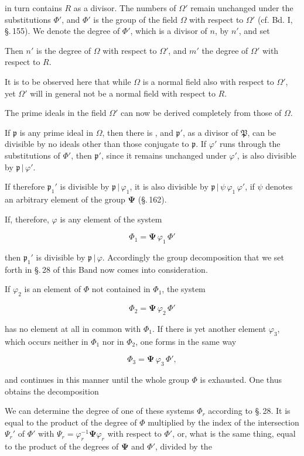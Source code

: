 in turn contains $R$ as a divisor. The numbers of $\Omega'$ remain
unchanged under the substitutions $\Phi'$, and $\Phi'$ is the group of the
field $\Omega$ with respect to $\Omega'$ (cf. Bd. I, \S.\,155). We denote
the degree of $\Phi'$, which is a divisor of $n$, by $n'$, and set


Then $n'$ is the degree of $\Omega$ with respect to $\Omega'$, and $m'$
the degree of $\Omega'$ with respect to $R$.

It is to be observed here that while $\Omega$ is a normal field
also with respect to $\Omega'$, yet $\Omega'$ will in general not be a
normal field with respect to $R$.

The prime ideals in the field $\Omega'$ can now be derived completely
from those of $\Omega$.

If $\mathfrak{p}$ is any prime ideal in $\Omega$, then there is , and $\mathfrak{p}'$, as a
divisor of $\mathfrak{P}$, can be divisible by no ideals other than those
conjugate to $\mathfrak{p}$. If $\varphi'$ runs through the substitutions of $\Phi'$, then $\mathfrak{p}'$,
since it remains unchanged under $\varphi'$, is also divisible by $\mathfrak{p}\,|\,\varphi'$.

If therefore $\mathfrak{p}_1'$ is divisible by $\mathfrak{p}\,|\,\varphi_1$, it is also divisible by
$\mathfrak{p}\,|\,\psi\,\varphi_1\,\varphi'$, if $\psi$ denotes an arbitrary element of the group
$\boldsymbol{\Psi}$ (\S.\,162).

If, therefore, $\varphi$ is any element of the system

\[
\Phi_1 = \boldsymbol{\Psi}\,\varphi_1\,\Phi'
\]

then $\mathfrak{p}_1'$ is divisible by $\mathfrak{p}\,|\,\varphi$. Accordingly the
group decomposition that we set forth in \S.\,28 of this Band now
comes into consideration.

If $\varphi_2$ is an element of $\Phi$ not contained in $\Phi_1$, the
system

\[
\Phi_2 = \boldsymbol{\Psi}\,\varphi_2\,\Phi'
\]

has no element at all in common with $\Phi_1$. If there is yet another
element $\varphi_3$, which occurs neither in $\Phi_1$ nor in $\Phi_2$, one forms
in the same way

\[
\Phi_3 = \boldsymbol{\Psi}\,\varphi_3\,\Phi',
\]

and continues in this manner until the whole group $\Phi$ is exhausted. One
thus obtains the decomposition


We can determine the degree of one of these systems $\Phi_r$ according
to \S.\,28. It is equal to the product of the degree of $\Phi$ multiplied by %
the index of the intersection $\Psi_r'$ of $\Phi'$ with $\Psi_r = \varphi_r^{-1}\boldsymbol{\Psi}\varphi_r$ with
respect to $\Phi'$, or, what is the same thing, equal to the product of the
degrees of $\boldsymbol{\Psi}$ and $\Phi'$, divided by the
